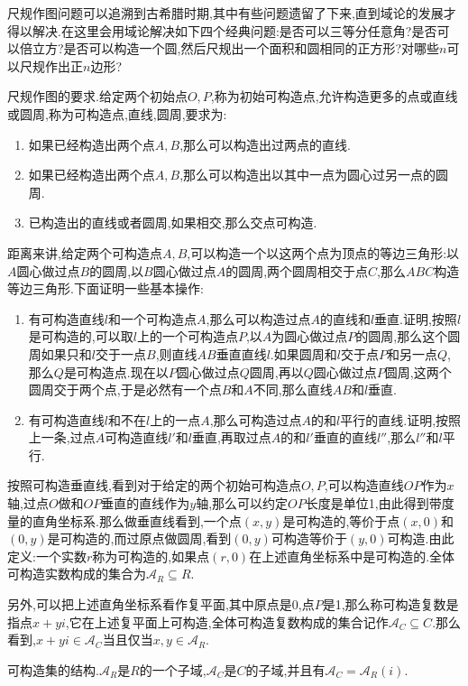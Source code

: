 尺规作图问题可以追溯到古希腊时期,其中有些问题遗留了下来,直到域论的发展才得以解决.在这里会用域论解决如下四个经典问题:是否可以三等分任意角?是否可以倍立方?是否可以构造一个圆,然后尺规出一个面积和圆相同的正方形?对哪些$n$可以尺规作出正$n$边形?

尺规作图的要求.给定两个初始点$O,P$,称为初始可构造点,允许构造更多的点或直线或圆周,称为可构造点,直线,圆周,要求为:
\begin{enumerate}
	\item 如果已经构造出两个点$A,B$,那么可以构造出过两点的直线.
	\item 如果已经构造出两个点$A,B$,那么可以构造出以其中一点为圆心过另一点的圆周.
	\item 已构造出的直线或者圆周,如果相交,那么交点可构造.
\end{enumerate}

距离来讲,给定两个可构造点$A,B$,可以构造一个以这两个点为顶点的等边三角形:以$A$圆心做过点$B$的圆周,以$B$圆心做过点$A$的圆周,两个圆周相交于点$C$,那么$ABC$构造等边三角形.下面证明一些基本操作:
\begin{enumerate}
	\item 有可构造直线$l$和一个可构造点$A$,那么可以构造过点$A$的直线和$l$垂直.证明,按照$l$是可构造的,可以取$l$上的一个可构造点$P$,以$A$为圆心做过点$P$的圆周,那么这个圆周如果只和$l$交于一点$B$,则直线$AB$垂直直线$l$.如果圆周和$l$交于点$P$和另一点$Q$,那么$Q$是可构造点.现在以$P$圆心做过点$Q$圆周,再以$Q$圆心做过点$P$圆周,这两个圆周交于两个点,于是必然有一个点$B$和$A$不同,那么直线$AB$和$l$垂直.
	\item 有可构造直线$l$和不在$l$上的一点$A$,那么可构造过点$A$的和$l$平行的直线.证明,按照上一条,过点$A$可构造直线$l'$和$l$垂直,再取过点$A$的和$l'$垂直的直线$l''$,那么$l''$和$l$平行.
\end{enumerate}

按照可构造垂直线,看到对于给定的两个初始可构造点$O,P$,可以构造直线$OP$作为$x$轴,过点$O$做和$OP$垂直的直线作为$y$轴,那么可以约定$OP$长度是单位1,由此得到带度量的直角坐标系.那么做垂直线看到,一个点$(x,y)$是可构造的,等价于点$(x,0)$和$(0,y)$是可构造的,而过原点做圆周,看到$(0,y)$可构造等价于$(y,0)$可构造.由此定义:一个实数$r$称为可构造的,如果点$(r,0)$在上述直角坐标系中是可构造的.全体可构造实数构成的集合为$\mathscr{A}_R\subseteq R$.

另外,可以把上述直角坐标系看作复平面,其中原点是0,点$P$是1,那么称可构造复数是指点$x+yi$,它在上述复平面上可构造,全体可构造复数构成的集合记作$\mathscr{A}_C\subseteq C$.那么看到,$x+yi\in\mathscr{A}_C$当且仅当$x,y\in\mathscr{A}_R$.

可构造集的结构.$\mathscr{A}_R$是$R$的一个子域,$\mathscr{A}_C$是$C$的子域,并且有$\mathscr{A}_C=\mathscr{A}_R(i)$.

